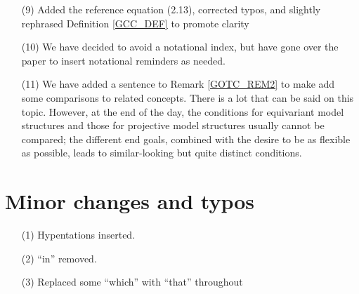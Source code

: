 \documentclass{article}
\begin{document}
\begin{enumerate}
\item[(9)] Added the reference equation (2.13), corrected typos, and slightly rephrased Definition \ref{GCC_DEF} to promote clarity
\item[(10)] We have decided to avoid a notational index, but have gone over the paper to insert notational reminders as needed.
\item[(11)] We have added a sentence to Remark \ref{GOTC_REM2} to make add some comparisons to related concepts.
        There is a lot that can be said on this topic.
        However, at the end of the day, the conditions for equivariant model structures and those for projective model structures usually cannot be compared;
        the different end goals, combined with the desire to be as flexible as possible, leads to similar-looking but quite distinct conditions.
\end{enumerate}



\section{Minor changes and typos}
 

\begin{enumerate}
\item[(1)] Hypentations inserted.
\item[(2)] ``in'' removed.
\item[(3)] Replaced some ``which'' with ``that'' throughout
        
\end{enumerate}






{}


\end{document}
